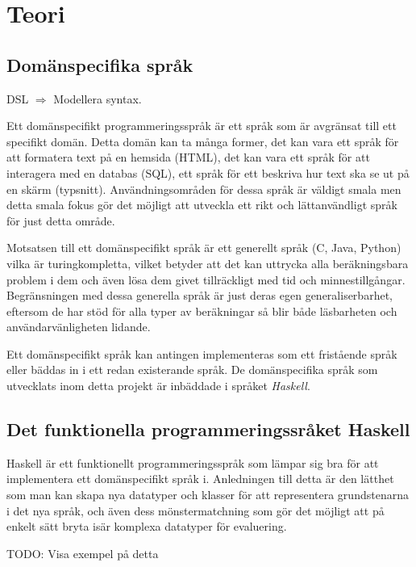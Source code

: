
\chapter{Teori}

\section{Domänspecifika språk}
\begin{binge}
DSL $\Rightarrow$ Modellera syntax.
\end{binge}
\begin{draft}
  Ett domänspecifikt programmeringsspråk är ett språk som är avgränsat till ett
  specifikt domän. Detta domän kan ta många former, det kan vara ett språk för
  att formatera text på en hemsida (HTML), det kan vara ett språk för att
  interagera med en databas (SQL), ett språk för ett beskriva hur text ska se
  ut på en skärm  (typsnitt). Användningsområden för dessa språk är väldigt
  smala men detta smala fokus gör det möjligt att utveckla ett rikt och
  lättanvändligt språk för just detta område. 

  Motsatsen till ett domänspecifikt språk är ett generellt språk (C, Java,
  Python) vilka är turingkompletta, vilket betyder att det kan uttrycka alla
  beräkningsbara problem i dem och även lösa dem givet tillräckligt med tid och
   minnestillgångar. Begränsningen med dessa generella språk är
  just deras egen generaliserbarhet, eftersom de har stöd för alla typer av
  beräkningar så blir både läsbarheten och användarvänligheten lidande.
  
  Ett domänspecifikt språk kan antingen implementeras som ett fristående språk
  eller bäddas in i ett redan existerande språk. De domänspecifika språk som
  utvecklats inom detta projekt är inbäddade i språket \textit{Haskell}.
\end{draft}

\section{Det funktionella programmeringssråket Haskell}

\begin{binge}
  Haskell är ett funktionellt programmeringsspråk som lämpar sig bra för att
  implementera ett domänspecifikt språk i. Anledningen till detta är den lätthet
  som man kan skapa nya datatyper och klasser för att representera grundstenarna
  i det nya språk, och även dess mönstermatchning som gör det möjligt att på
  enkelt sätt bryta isär komplexa datatyper för evaluering.
  
  TODO: Visa exempel på detta
\end{binge}

